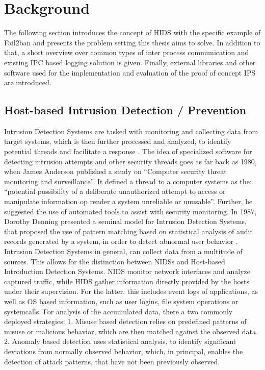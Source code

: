 %
%

\chapter{Background} \label{sec:background}

The following section introduces the concept of \ac{HIDS} with the specific example of Fail2ban and presents the problem setting 
this thesis aims to solve. In addition to that, a short overview over common types of inter process communication and existing \ac{IPC} based logging solution is given. 
Finally, external libraries and other software used for the implementation and evaluation of the proof of concept \ac{IPS} are introduced.    

\section{Host-based Intrusion Detection / Prevention} \label{sec:hids}

Intrusion Detection Systems are tasked with monitoring and collecting data from target systems, which is then further processed and analyzed, to identify 
potential threads and facilitate a response \cite{vigna2006}.
The idea of specialized software for detecting intrusion attempts and other 
security threads goes as far back as 1980, when James Anderson published a study on 
``Computer security threat monitoring and surveillance''\cite{anderson1980}. It defined a thread to a computer systems as the: ``potential possibility of a deliberate unauthorized attempt to access or manipulate information
op render a system unreliable or unusable''\cite[p.6]{anderson1980}. Further, he suggested the use of automated tools to assist with security monitoring. In 1987, Dorothy
Denning presented a seminal model for Intrusion Detection Systems, that proposed the use of pattern matching based on
statistical analysis of audit records generated by a system, in order to detect abnormal user behavior \cite{denning1987}. 
Intrusion Detection Systems in general, can collect data from a multitude of sources. This allows for the distinction between \acp{NIDS} and Host-based Introduction Detection Systems. \ac{NIDS}
monitor network interfaces and analyze captured traffic, while \ac{HIDS} gather information directly provided by the hosts under their supervision. For the latter, this includes event logs of applications, as well as \ac{OS} based information,
such as user logins, file system operations or systemcalls. For analysis of the accumulated data, there a two commonly deployed strategies: 1. Misuse based detection relies on predefined 
patterns of misuse or malicious behavior, which are then matched against the observed data. 2. Anomaly based detection uses statistical analysis, to identify significant deviations
from normally observed behavior, which, in principal, enables the detection of attack patterns, that have not been previously observed. \cite{vigna2006} 

